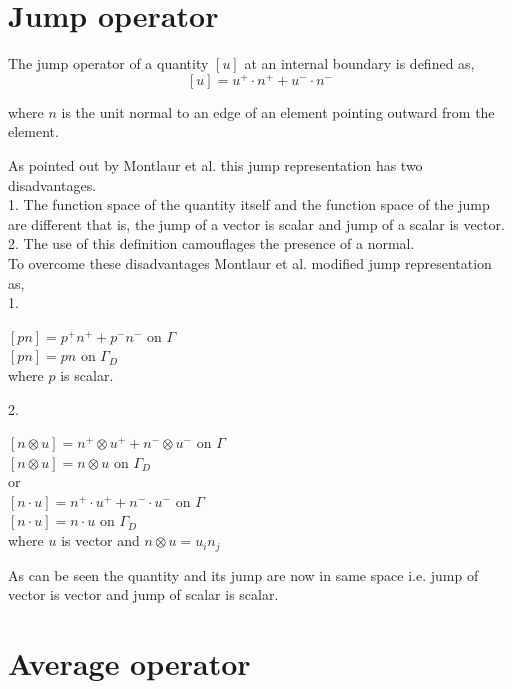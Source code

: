 \documentclass[a4paper]{book}
\begin{document}
\section{Jump operator}

The jump operator of a quantity $[u]$ at an internal boundary is defined as,
\begin{equation}\label{jump operator}
[u]=u^+ \cdot n^+ + u^- \cdot n^-
\end{equation}

where $n$ is the unit normal to an edge of an element pointing outward from the element.

As pointed out by Montlaur et al. \cite{Montlaur2} this jump representation has two disadvantages.\\

1. The function space of the quantity itself and the function space of the jump are different that is, the jump of a vector is scalar and jump of a scalar is vector.\\
2. The use of this definition camouflages the presence of a normal.\\

To overcome these disadvantages Montlaur et al. \cite{Montlaur2} modified jump representation as,\\

1.  
\begin{center}
$[pn] = p^+ n^+ + p^- n^- $ on $\Gamma$\\
$[pn] = p n $ on $\Gamma_D$\\
where $p$ is scalar.
\end{center}

2. \\
\begin{center}
$[n \otimes u] = n^+ \otimes u^+ + n^- \otimes u^-$ on $\Gamma$\\
$[n \otimes u] = n \otimes u$ on $\Gamma_D$\\
 or \\
$[n \cdot u] = n^+ \cdot u^+ + n^- \cdot u^-$ on $\Gamma$\\
$[n \cdot u] = n \cdot u$ on $\Gamma_D$\\
where $u$ is vector and $n \otimes u = u_i n_j$\\ 
\end{center}

As can be seen the quantity and its jump are now in same space i.e. jump of vector is vector and jump of scalar is scalar.

\section{Average operator}
\end{document}

